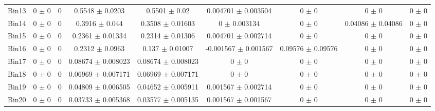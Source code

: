 \begin{tabular}{@{\extracolsep{4pt}}lcccccccc@{}}
     Bin13 & 0 $\pm$ 0 & 0 & 0.5548 $\pm$ 0.0203 & 0.5501 $\pm$ 0.02 & 0.004701 $\pm$ 0.003504 & 0 $\pm$ 0 & 0 $\pm$ 0 & 0 $\pm$ 0 \\ 
     Bin14 & 0 $\pm$ 0 & 0 & 0.3916 $\pm$ 0.044 & 0.3508 $\pm$ 0.01603 & 0 $\pm$ 0.003134 & 0 $\pm$ 0 & 0.04086 $\pm$ 0.04086 & 0 $\pm$ 0 \\ 
     Bin15 & 0 $\pm$ 0 & 0 & 0.2361 $\pm$ 0.01334 & 0.2314 $\pm$ 0.01306 & 0.004701 $\pm$ 0.002714 & 0 $\pm$ 0 & 0 $\pm$ 0 & 0 $\pm$ 0 \\ 
     Bin16 & 0 $\pm$ 0 & 0 & 0.2312 $\pm$ 0.0963 & 0.137 $\pm$ 0.01007 & -0.001567 $\pm$ 0.001567 & 0.09576 $\pm$ 0.09576 & 0 $\pm$ 0 & 0 $\pm$ 0 \\ 
     Bin17 & 0 $\pm$ 0 & 0 & 0.08674 $\pm$ 0.008023 & 0.08674 $\pm$ 0.008023 & 0 $\pm$ 0 & 0 $\pm$ 0 & 0 $\pm$ 0 & 0 $\pm$ 0 \\ 
     Bin18 & 0 $\pm$ 0 & 0 & 0.06969 $\pm$ 0.007171 & 0.06969 $\pm$ 0.007171 & 0 $\pm$ 0 & 0 $\pm$ 0 & 0 $\pm$ 0 & 0 $\pm$ 0 \\ 
     Bin19 & 0 $\pm$ 0 & 0 & 0.04809 $\pm$ 0.006505 & 0.04652 $\pm$ 0.005911 & 0.001567 $\pm$ 0.002714 & 0 $\pm$ 0 & 0 $\pm$ 0 & 0 $\pm$ 0 \\ 
     Bin20 & 0 $\pm$ 0 & 0 & 0.03733 $\pm$ 0.005368 & 0.03577 $\pm$ 0.005135 & 0.001567 $\pm$ 0.001567 & 0 $\pm$ 0 & 0 $\pm$ 0 & 0 $\pm$ 0 \\ 
\hline\hline
  \end{tabular}
